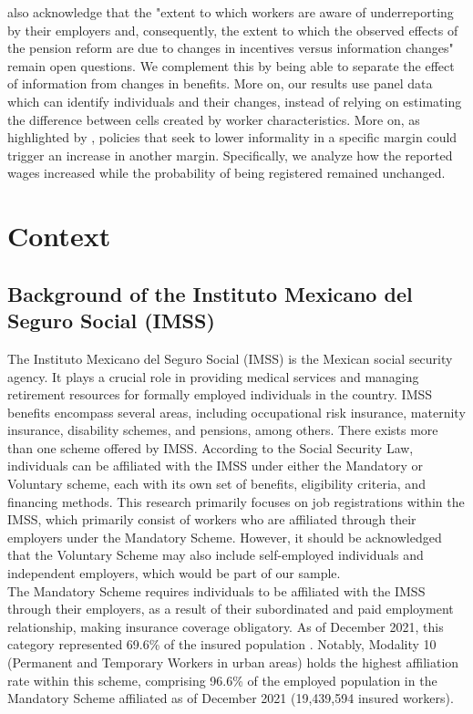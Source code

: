 \documentclass[10pt, oneside]{book}
\begin{document}
\cite{kumler2020enlisting} also acknowledge that the "extent to which workers are aware of underreporting by their employers and, consequently, the extent to which the observed effects of the pension reform are due to changes in incentives versus information changes" remain open questions. We complement this by being able to separate the effect of information from changes in benefits. More on, our results use panel data which can identify individuals and their changes, instead of relying on estimating the difference between cells created by worker characteristics. More on, as highlighted by \cite{Ulyssea}, policies that seek to lower informality in a specific margin could trigger an increase in another margin. Specifically, we analyze how the reported wages increased while the probability of being registered remained unchanged. \\

\chapter{Context} \label{context}

\section{Background of the Instituto Mexicano del Seguro Social (IMSS)}

The Instituto Mexicano del Seguro Social (IMSS) is the Mexican social security agency. It plays a crucial role in providing medical services and managing retirement resources for formally employed individuals in the country. IMSS benefits encompass several areas, including occupational risk insurance, maternity insurance, disability schemes, and pensions, among others. There exists more than one scheme offered by IMSS. According to the Social Security Law, individuals can be affiliated with the IMSS under either the Mandatory or Voluntary scheme, each with its own set of benefits, eligibility criteria, and financing methods. This research primarily focuses on job registrations within the IMSS, which primarily consist of workers who are affiliated through their employers under the Mandatory Scheme. However, it should be acknowledged that the Voluntary Scheme may also include self-employed individuals and independent employers, which would be part of our sample. \\

The Mandatory Scheme requires individuals to be affiliated with the IMSS through their employers, as a result of their subordinated and paid employment relationship, making insurance coverage obligatory. As of December 2021, this category represented 69.6\% of the insured population \citep{IMSS22}. Notably, Modality 10 (Permanent and Temporary Workers in urban areas) holds the highest affiliation rate within this scheme, comprising 96.6\% of the employed population in the Mandatory Scheme affiliated as of December 2021 (19,439,594 insured workers). \\
\end{document}
